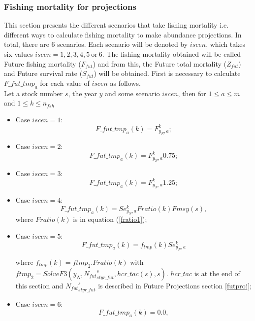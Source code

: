 \documentclass{article}
\begin{document}
\subsubsection{Fishing mortality for projections} \label{Fproj}
This section presents the different scenarios that take fishing mortality i.e. different ways to calculate fishing mortality to make abundance projections. In total, there are 6 scenarios. Each scenario will be denoted by $iscen$, which takes six values $iscen = 1,2,3,4,5\ \text{or} \ 6$. The fishing mortality obtained will be called Future fishing mortality ($F_{fut}$) and from this, the Future total mortality ($Z_{fut}$) and Future survival rate ($S_{fut}$)  will be obtained. First is necessary to calculate $F\_fut\_tmp_a$ for each value of $iscen$ as follows.\\

Let a stock number $s$, the year $y$ and some scenario $iscen$, then for $1\leq a \leq m$ and  $1\leq k \leq n_{fsh}$


\begin{itemize}
    \item Case $iscen=1$: \begin{equation}
        F\_fut\_tmp_a(k)=F^k_{y_N,a}; 
        \end{equation}
        
    \item Case $iscen=2$:  \begin{equation}
        F\_fut\_tmp_a(k) = F^k_{y_N,a} 0.75;  
    \end{equation}
    
    \item Case $iscen=3$:  \begin{equation}
        F\_fut\_tmp_a(k) = F^{k}_{y_N,a} 1.25; 
    \end{equation}
    
    \item Case $iscen=4$:
    \begin{equation}
        F\_fut\_tmp_a(k)=Se^k_{y_N,a} Fratio(k) Fmsy(s),
    \end{equation}
    where $Fratio(k)$ is in equation (\ref{fratio1}); %
    
    \item Case $iscen=5$:
    \begin{equation} \label{nfut}
        F\_fut\_tmp_a(k)=f_{tmp}(k) Se^k_{y_N,a}
    \end{equation}
    
    where $f_{tmp}(k) = ftmp_2 .Fratio(k)$ with 
        $ftmp_2 = SolveF3(y_N, {N_{fut}}_{{styr\_fut}}^{s}, hcr\_tac(s), s)$. %
        $hcr\_tac$ is at the end of this section and ${N_{fut}}_{{styr\_fut}}^{s}$ is described in Future Projections section \ref{futproj};
 
    
    \item Case $iscen=6$:
    \begin{equation}
        F\_fut\_tmp_a(k) = 0.0,
    \end{equation}
\end{itemize}
\end{document}
